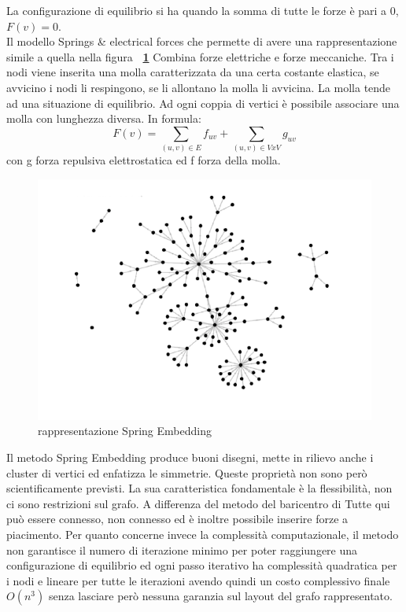 {La configurazione di equilibrio si ha quando la somma di tutte le forze è pari a 0, $F(v)=0$.\\
Il modello Springs \& electrical forces che permette di avere una rappresentazione simile a quella nella figura \textbf{\figurename~\ref{fig:spring}} Combina forze elettriche e forze meccaniche. Tra i nodi
viene inserita una molla caratterizzata da una certa costante elastica, se avvicino i nodi li respingono, se li allontano la molla li avvicina. La molla tende ad una situazione di equilibrio.
Ad ogni coppia di vertici è possibile associare una molla con lunghezza diversa. In formula:
$$ F(v)= \sum\limits_{(u,v)\in E} f_{uv} + \sum\limits_{(u,v)\in VxV} g_{uv} $$
con g forza repulsiva elettrostatica ed f forza della molla.\\
 \begin{figure}[!htb]
	\begin{center}
		\includegraphics[width=0.8 \linewidth]{figure/spring}
	\end{center}
	\caption{rappresentazione Spring Embedding\label{fig:spring}}
\end{figure}
Il metodo Spring Embedding produce buoni disegni, mette in rilievo anche i cluster di vertici ed enfatizza le simmetrie. Queste proprietà non sono però scientificamente previsti. La sua caratteristica fondamentale è la flessibilità, non ci sono restrizioni sul grafo. A differenza del metodo del baricentro di Tutte qui può essere connesso, non connesso ed è inoltre possibile inserire forze a piacimento.
Per quanto concerne invece la complessità computazionale, il metodo non garantisce il numero di iterazione minimo per poter raggiungere una configurazione di equilibrio ed ogni passo iterativo ha complessità quadratica per i nodi e lineare per tutte le iterazioni avendo quindi un costo complessivo finale $O(n^3)$ senza lasciare però nessuna garanzia sul layout del grafo rappresentato.
}
